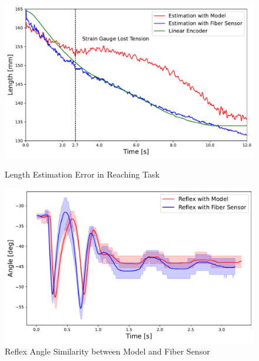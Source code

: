 \begin{figure}[t]
    \centering
    \begin{minipage}[H]{\textwidth} 
        \begin{minipage}[H]{0.48\textwidth} 
            \centering
            \includegraphics[width=\columnwidth]{fig/reaching_error.pdf}
            \caption{Length Estimation Error in Reaching Task}
            \label{fig:reaching_error}
            \vspace{1em}
            \addtocounter{figure}{1}
            \includegraphics[width=\columnwidth]{fig/time_vs_angle_model_sensor.pdf}
            \caption{Reflex Angle Similarity between Model and Fiber Sensor}
            \label{fig:reflex_angle}
            \setcounter{figure}{7}  
            \renewcommand{\thefigure}{\arabic{figure}}  
        \end{minipage}
        \hfill
        \begin{minipage}[H]{0.48\textwidth} 
            \centering

\end{minipage}
\end{minipage}
\end{figure}
